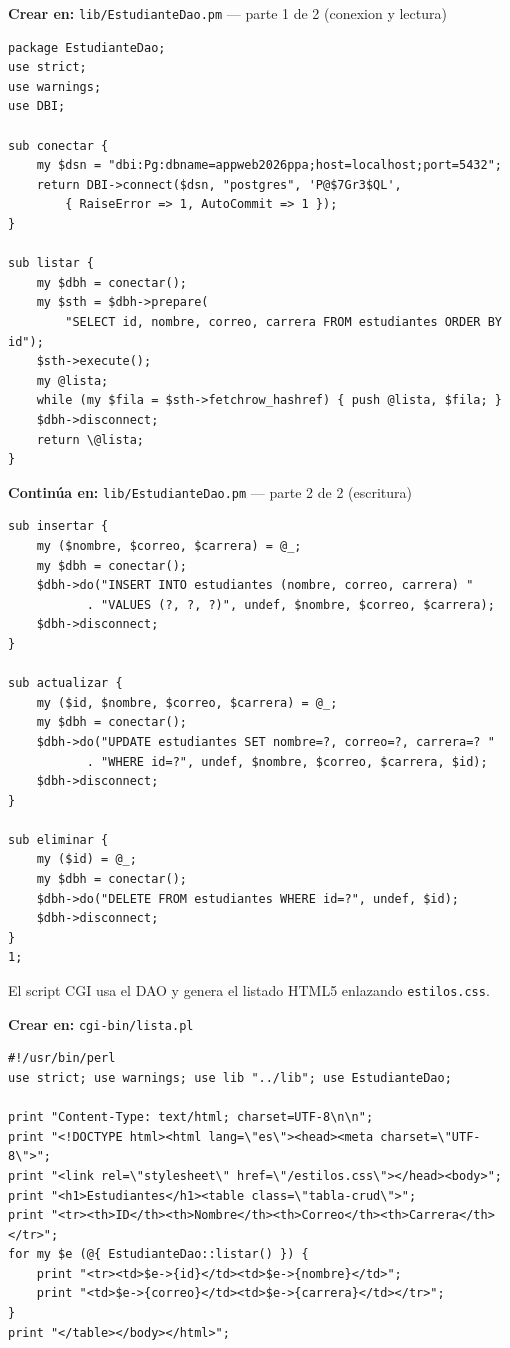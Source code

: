{\small\textbf{Crear en:} \texttt{lib/EstudianteDao.pm} --- parte 1 de 2 (conexion y lectura)}
\begin{lstlisting}[style=perl,caption={EstudianteDao.pm --- parte 1: conexion y listar},label={lst:c6-perl-a}]
package EstudianteDao;
use strict;
use warnings;
use DBI;

sub conectar {
    my $dsn = "dbi:Pg:dbname=appweb2026ppa;host=localhost;port=5432";
    return DBI->connect($dsn, "postgres", 'P@$7Gr3$QL',
        { RaiseError => 1, AutoCommit => 1 });
}

sub listar {
    my $dbh = conectar();
    my $sth = $dbh->prepare(
        "SELECT id, nombre, correo, carrera FROM estudiantes ORDER BY id");
    $sth->execute();
    my @lista;
    while (my $fila = $sth->fetchrow_hashref) { push @lista, $fila; }
    $dbh->disconnect;
    return \@lista;
}
\end{lstlisting}

{\small\textbf{Continúa en:} \texttt{lib/EstudianteDao.pm} --- parte 2 de 2 (escritura)}
\begin{lstlisting}[style=perl,caption={EstudianteDao.pm --- parte 2: insertar, actualizar, eliminar},label={lst:c6-perl-b}]
sub insertar {
    my ($nombre, $correo, $carrera) = @_;
    my $dbh = conectar();
    $dbh->do("INSERT INTO estudiantes (nombre, correo, carrera) "
           . "VALUES (?, ?, ?)", undef, $nombre, $correo, $carrera);
    $dbh->disconnect;
}

sub actualizar {
    my ($id, $nombre, $correo, $carrera) = @_;
    my $dbh = conectar();
    $dbh->do("UPDATE estudiantes SET nombre=?, correo=?, carrera=? "
           . "WHERE id=?", undef, $nombre, $correo, $carrera, $id);
    $dbh->disconnect;
}

sub eliminar {
    my ($id) = @_;
    my $dbh = conectar();
    $dbh->do("DELETE FROM estudiantes WHERE id=?", undef, $id);
    $dbh->disconnect;
}
1;
\end{lstlisting}

El script CGI usa el DAO y genera el listado HTML5 enlazando
\texttt{estilos.css}.

{\small\textbf{Crear en:} \texttt{cgi-bin/lista.pl}}
\begin{lstlisting}[style=perl,caption={lista.pl --- vista de listado},label={lst:c6-perl-vista}]
#!/usr/bin/perl
use strict; use warnings; use lib "../lib"; use EstudianteDao;

print "Content-Type: text/html; charset=UTF-8\n\n";
print "<!DOCTYPE html><html lang=\"es\"><head><meta charset=\"UTF-8\">";
print "<link rel=\"stylesheet\" href=\"/estilos.css\"></head><body>";
print "<h1>Estudiantes</h1><table class=\"tabla-crud\">";
print "<tr><th>ID</th><th>Nombre</th><th>Correo</th><th>Carrera</th></tr>";
for my $e (@{ EstudianteDao::listar() }) {
    print "<tr><td>$e->{id}</td><td>$e->{nombre}</td>";
    print "<td>$e->{correo}</td><td>$e->{carrera}</td></tr>";
}
print "</table></body></html>";
\end{lstlisting}

